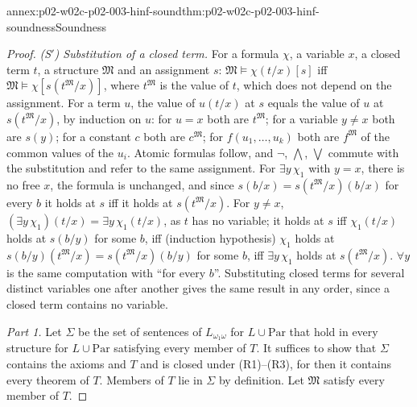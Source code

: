 \begin{annexitem}{annex:p02-w02c-p02-003-hinf-sound}{thm:p02-w02c-p02-003-hinf-soundness}{Soundness}
\begin{proof}
\emph{(S\('\)) Substitution of a closed term.}  For a formula \(\chi\), a
variable \(x\), a closed term \(t\), a structure \(\mathfrak M\) and an
assignment \(s\): \(\mathfrak M\models\chi(t/x)[s]\) iff
\(\mathfrak M\models\chi[s(t^{\mathfrak M}/x)]\), where \(t^{\mathfrak M}\)
is the value of \(t\), which does not depend on the assignment.  For a term
\(u\), the value of \(u(t/x)\) at \(s\) equals the value of \(u\) at
\(s(t^{\mathfrak M}/x)\), by induction on \(u\): for \(u=x\) both are
\(t^{\mathfrak M}\); for a variable \(y\neq x\) both are \(s(y)\); for a
constant \(c\) both are \(c^{\mathfrak M}\); for \(f(u_1,\ldots,u_k)\) both
are \(f^{\mathfrak M}\) of the common values of the \(u_i\).  Atomic formulas
follow, and \(\neg\), \(\bigwedge\), \(\bigvee\) commute with the
substitution and refer to the same assignment.  For \(\exists y\,\chi_1\)
with \(y=x\), there is no free \(x\), the formula is unchanged, and since
\(s(b/x)=s(t^{\mathfrak M}/x)(b/x)\) for every \(b\) it holds at \(s\) iff
it holds at \(s(t^{\mathfrak M}/x)\).  For \(y\neq x\),
\((\exists y\,\chi_1)(t/x)=\exists y\,\chi_1(t/x)\), as \(t\) has no
variable; it holds at \(s\) iff \(\chi_1(t/x)\) holds at \(s(b/y)\) for
some \(b\), iff (induction hypothesis) \(\chi_1\) holds at
\(s(b/y)(t^{\mathfrak M}/x)=s(t^{\mathfrak M}/x)(b/y)\) for some \(b\), iff
\(\exists y\,\chi_1\) holds at \(s(t^{\mathfrak M}/x)\).  \(\forall y\) is
the same computation with ``for every \(b\)''.  Substituting closed terms
for several distinct variables one after another gives the same result in
any order, since a closed term contains no variable.

\emph{Part 1.}  Let \(\Sigma\) be the set of sentences of
\(L_{\omega_1\omega}\) for \(L\cup\mathrm{Par}\) that hold in every
structure for \(L\cup\mathrm{Par}\) satisfying every member of \(T\).  It
suffices to show that \(\Sigma\) contains the axioms and \(T\) and is closed
under (R1)--(R3), for then it contains every theorem of \(T\).  Members of
\(T\) lie in \(\Sigma\) by definition.  Let \(\mathfrak M\) satisfy every
member of \(T\).


\end{proof}
\end{annexitem}
